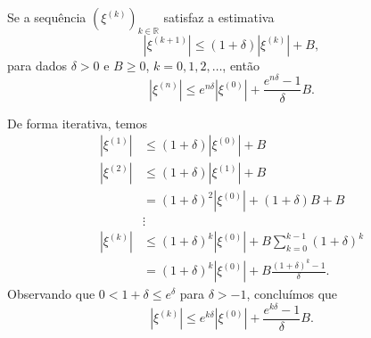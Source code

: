 \begin{lema}\label{cap_pvi_sec_euler:lema:aux}
  Se a sequência $\left(\xi^{(k)}\right)_{k\in\mathbb{R}}$ satisfaz a estimativa
  \begin{equation}
    \left|\xi^{(k+1)}\right| \leq (1 + \delta)\left|\xi^{(k)}\right| + B,
  \end{equation}
  para dados $\delta > 0$ e $B\geq 0$, $k=0, 1, 2, \ldots$, então
  \begin{equation}
    \left|\xi^{(n)}\right| \leq e^{n\delta}\left|\xi^{(0)}\right| + \frac{e^{n\delta}-1}{\delta}B.
  \end{equation}
\end{lema}
\begin{dem}
  De forma iterativa, temos
  \begin{align}
    \left|\xi^{(1)}\right| &\leq (1 + \delta)\left|\xi^{(0)}\right| + B\\
    \left|\xi^{(2)}\right| &\leq (1 + \delta)\left|\xi^{(1)}\right| + B\\
                           &= (1+\delta)^2\left|\xi^{(0)}\right| + (1+\delta)B + B\\
                           &\vdots\\
    \left|\xi^{(k)}\right| &\leq (1 + \delta)^k\left|\xi^{(0)}\right| + B\sum_{k=0}^{k-1}(1+\delta)^k\\
                           &= (1 + \delta)^k\left|\xi^{(0)}\right| + B\frac{(1+\delta)^k-1}{\delta}.
  \end{align}
  Observando que $0<1+\delta\leq e^{\delta}$ para $\delta>-1$, concluímos que
  \begin{equation}
    \left|\xi^{(k)}\right| \leq e^{k\delta}\left|\xi^{(0)}\right| + \frac{e^{k\delta}-1}{\delta}B.
  \end{equation}
\end{dem}

